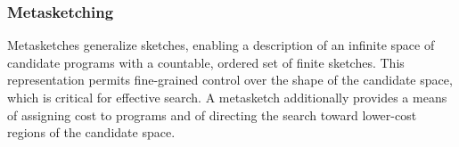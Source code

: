 

\subsubsection{Metasketching}
\label{sec:metasketching}


Metasketches generalize sketches, enabling a description of an infinite space of
candidate programs with a countable, ordered set of finite sketches.
This representation permits fine-grained control over the shape of the candidate
space, which is critical for effective search.
A metasketch additionally provides a means of assigning cost to programs and of
directing the search toward lower-cost regions of the candidate space.





